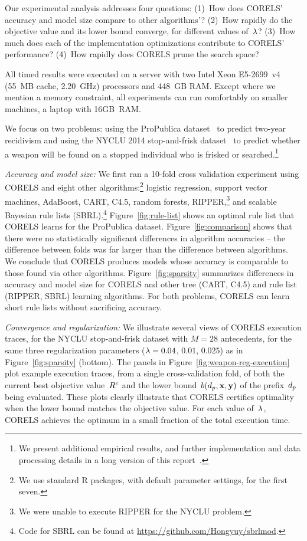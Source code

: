 
Our experimental analysis addresses four questions:
(1)~How does CORELS' accuracy and model size compare to other algorithms'?
(2)~How rapidly do the objective value and its lower bound converge, for different values of~${\lambda}$?
(3)~How much does each of the implementation optimizations contribute to CORELS' performance?
(4)~How rapidly does CORELS prune the search space?

All timed results were executed on a server with two Intel Xeon E5-2699~v4
(55~MB cache, 2.20~GHz) processors and 448~GB RAM.
%
Except where we mention a memory constraint, all experiments
can run comfortably on smaller machines, \eg a laptop with 16GB~RAM.

We focus on two problems:
using the ProPublica dataset~\citep{LarsonMaKiAn16} to predict two-year recidivism
and using the NYCLU 2014 stop-and-frisk dataset~\citep{nyclu:2014} to predict
whether a weapon will be found on a stopped individual who is frisked or searched.\footnote{We
present additional empirical results, and further implementation and data processing details
in a long version of this report~\citep{AngelinoLaAlSeRu17}.}

\textit{Accuracy and model size:}
We first ran a 10-fold cross validation experiment using CORELS
and eight other algorithms:\footnote{We use standard R packages, with default
parameter settings, for the first seven.}
logistic regression, support vector machines, AdaBoost, CART, C4.5, random forests,
RIPPER,\footnote{We were unable to execute RIPPER for the NYCLU problem.}
and scalable Bayesian rule lists (SBRL).\footnote{Code for SBRL can be found at
\url{https://github.com/Hongyuy/sbrlmod}.}
%
Figure~\ref{fig:rule-list} shows an  optimal rule list that CORELS learns
for the ProPublica dataset.
%
Figure~\ref{fig:comparison} shows that there were no statistically significant
differences in algorithm accuracies --
the difference between folds was far larger than the difference between algorithms.
%
We conclude that CORELS produces models whose accuracy is comparable to those found via other algorithms.
%
Figure~\ref{fig:sparsity} summarizes differences in accuracy and model size
for CORELS and other tree (CART, C4.5) and rule list (RIPPER, SBRL) learning algorithms.
%
For both problems, CORELS can learn short rule lists without sacrificing accuracy.

\textit{Convergence and regularization:}
We illustrate several views of CORELS execution traces,
for the NYCLU stop-and-frisk dataset with ${M = 28}$ antecedents,
for the same three regularization parameters (${{\lambda} = 0.04}$, $0.01$, $0.025$)
as in Figure~\ref{fig:sparsity} (bottom).
%
The panels in Figure~\ref{fig:weapon-reg-execution} plot example execution traces,
from a single cross-validation fold, of both the current best objective value~${R^c}$
and the lower bound~$b(d_p, \mathbf{x}, \mathbf{y})$ of the prefix~$d_p$ being evaluated.
%
These plots clearly illustrate that CORELS certifies optimality
when the lower bound matches the objective value.
%
For each value of~${\lambda}$, CORELS achieves the optimum in a small fraction of the total execution time.

